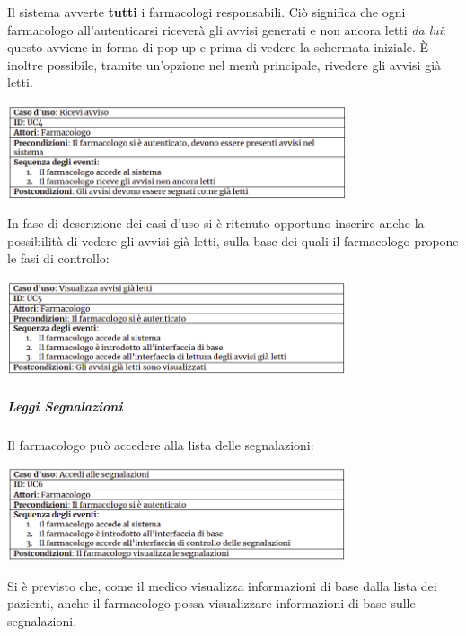 \documentclass{article}
\begin{document}
            Il sistema avverte \textbf{tutti} i farmacologi responsabili. Ciò significa che ogni farmacologo all'autenticarsi riceverà gli avvisi generati e non ancora letti \textit{da lui}:
            questo avviene in forma di pop-up e prima di vedere la schermata iniziale. È inoltre possibile, tramite un'opzione nel menù principale, rivedere gli avvisi già letti.
                \begin{center}
                    \includegraphics[width=0.75\textwidth]{pictures/UC4.png}
                \end{center}
            In fase di descrizione dei casi d'uso si è ritenuto opportuno inserire anche la possibilità di vedere gli avvisi già letti, sulla base dei quali il farmacologo propone le fasi di controllo:
                \begin{center}
                    \includegraphics[width=0.75\textwidth]{pictures/UC5.png}
                \end{center}
        \subparagraph*{Leggi Segnalazioni}
            Il farmacologo può accedere alla lista delle segnalazioni:
                \begin{center}
                    \includegraphics[width=0.75\textwidth]{pictures/UC6.png}
                \end{center}
            Si è previsto che, come il medico visualizza informazioni di base dalla lista dei pazienti, anche il farmacologo possa visualizzare informazioni di base sulle segnalazioni. 
\end{document}
